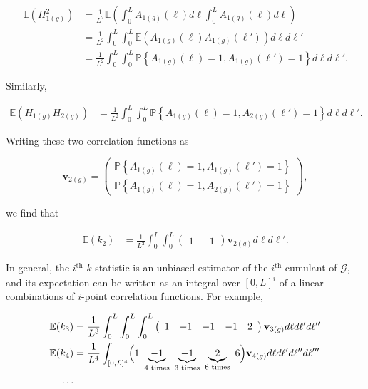 \documentclass[11pt]{amsart}
\begin{document}
\begin{align*}
	\mathbb{E}(H_{1(g)}^2)
		&=\frac{1}{L^2}\mathbb{E}\left(\int_0^L A_{1(g)}(\ell) d\ell \int_0^L A_{1(g)}(\ell) d\ell\right)\\
		&=\frac{1}{L^2}\int_0^L\int_0^L\mathbb{E}\left(A_{1(g)}(\ell) A_{1(g)}(\ell')\right) d\ell d\ell'\\
		&=\frac{1}{L^2}\int_0^L\int_0^L\mathbb{P}\left\{A_{1(g)}(\ell)=1, A_{1(g)}(\ell')=1\right\} d\ell d\ell'.
\end{align*}

Similarly,

\begin{align*}
	\mathbb{E}(H_{1(g)}H_{2(g)})
		&=\frac{1}{L^2}\int_0^L\int_0^L\mathbb{P}\left\{ A_{1(g)}(\ell)=1, A_{2(g)}(\ell')=1\right\} d\ell d\ell'.
\end{align*}

Writing these two correlation functions as 

$$\mathbf{v}_{2(g)}=\left( \begin{array}{r}
			\mathbb{P}\left\{A_{1(g)}(\ell)=1, A_{1(g)}(\ell')=1\right\} \\ \mathbb{P}\left\{A_{1(g)}(\ell)=1, A_{2(g)}(\ell')=1\right\}
		\end{array} \right),$$

we find that

\begin{align}
	\mathbb{E}(k_2)&=\frac{1}{L^2}\int_0^L\int_0^L\left( \begin{array}{cc}
			1 & -1	\end{array} \right)\mathbf{v}_{2(g)} d\ell d\ell'.
	\label{k2}
\end{align}

In general, the $i^\text{th}$ $k$-statistic is an unbiased estimator of the $i^\text{th}$ cumulant of $\mathcal{G}$, and its expectation can be written as an integral over $[0,L]^i $ of a linear combinations of $i$-point correlation functions.
For example, 

\begin{align*}
	\mathbb{E}(k_3)&=\frac{1}{L^3}\int_0^L\int_0^L\int_0^L\left( \begin{array}{ccccc}
			1 & -1 &-1 &-1 &2	\end{array} \right)\mathbf{v}_{3(g)} d\ell d\ell'd\ell''\\
	\mathbb{E}(k_4)&=\frac{1}{L^4}\int_{[0,L]^4}\Bigl(
			1 \  \underbrace{-1}_\text{4 times} \  \underbrace{-1}_\text{3 times} \  \underbrace{2}_\text{6 times} \ 6 \Bigr)\mathbf{v}_{4(g)} d\ell d\ell'd\ell''d\ell'''\\
			\dots
\end{align*}
\end{document}
